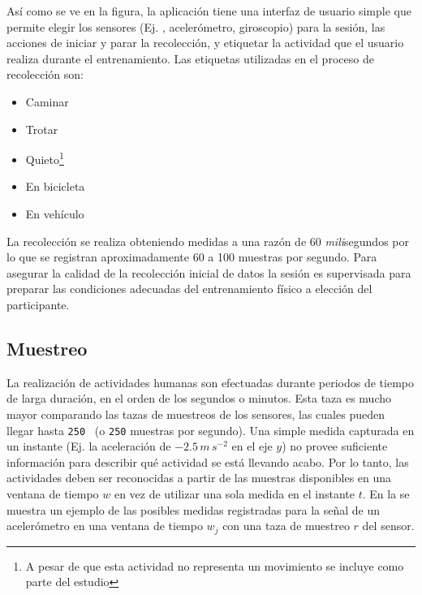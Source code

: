 Así como se ve en la figura, la aplicación tiene una interfaz de usuario
simple que permite elegir los sensores (Ej. , acelerómetro,
giroscopio) para la sesión, las acciones de iniciar y parar la recolección,
y etiquetar la actividad que el usuario realiza durante el entrenamiento.
Las etiquetas utilizadas en el proceso de recolección son:
\begin{itemize}
\item Caminar
\item Trotar
\item Quieto\footnote{A pesar de que esta actividad no representa un movimiento se incluye
como parte del estudio}
\item En bicicleta
\item En vehículo
\end{itemize}
La recolección se realiza obteniendo medidas a una razón de 60 \emph{mili}segundos
por lo que se registran aproximadamente 60 a 100 muestras por segundo.
Para asegurar la calidad de la recolección inicial de datos la sesión
es supervisada para preparar las condiciones adecuadas del entrenamiento
físico a elección del participante.

\subsection{Muestreo}

\label{ssec44:sampling}La realización de actividades humanas son
efectuadas durante periodos de tiempo de larga duración, en el orden
de los segundos o minutos. Esta taza es mucho mayor comparando las
tazas de muestreos de los sensores, las cuales pueden llegar hasta
\texttt{250 } (o \texttt{250} muestras por segundo). Una
simple medida capturada en un instante (Ej. la aceleración de $-2.5\,m\,s^{-2}$
en el eje $y$) no provee suficiente información para describir qué
actividad se está llevando acabo. Por lo tanto, las actividades deben
ser reconocidas a partir de las muestras disponibles en una ventana
de tiempo $w$ en vez de utilizar una sola medida en el instante $t$.
En la  se muestra un ejemplo de las posibles
medidas registradas para la señal de un acelerómetro en una ventana
de tiempo $w_{j}$ con una taza de muestreo $r$ del sensor.


